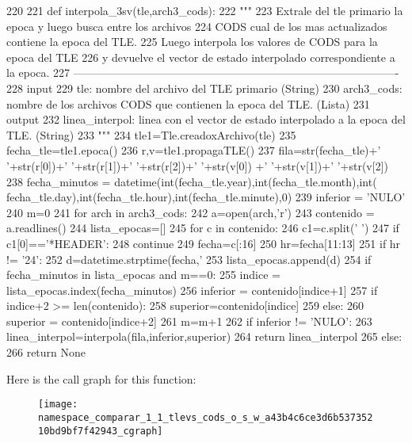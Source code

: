 \begin{DoxyCode}
220 
221 def interpola_3sv(tle,arch3_cods):
222     """
223     Extrale del tle primario la epoca y luego busca entre los archivos
224     CODS cual de los mas actualizados contiene la epoca del TLE.
225     Luego interpola los valores de CODS para la epoca del TLE 
226     y devuelve el vector de estado interpolado correspondiente a la epoca.
227    
       ----------------------------------------------------------------------------------------
228     input
229         tle: nombre del archivo del TLE primario (String)
230         arch3_cods: nombre de los archivos CODS que contienen la epoca del TLE.
       (Lista)
231     output
232         linea_interpol: linea con el vector de estado interpolado a la epoca
       del TLE. (String)
233     """
234     tle1=Tle.creadoxArchivo(tle)
235     fecha_tle=tle1.epoca()
236     r,v=tle1.propagaTLE()
237     fila=str(fecha_tle)+' '+str(r[0])+' '+str(r[1])+' '+str(r[2])+' '+str(v[0])
      +' '+str(v[1])+' '+str(v[2])
238     fecha_minutos = datetime(int(fecha_tle.year),int(fecha_tle.month),int(
      fecha_tle.day),int(fecha_tle.hour),int(fecha_tle.minute),0)
239     inferior = 'NULO' 
240     m=0
241     for arch in arch3_cods:
242         a=open(arch,'r')
243         contenido = a.readlines()
244         lista_epocas=[]
245         for c in contenido:
246             c1=c.split(' ')
247             if c1[0]=='*HEADER':
248                 continue
249             fecha=c[:16]
250             hr=fecha[11:13]
251             if hr != '24':
252                 d=datetime.strptime(fecha,'%
253             lista_epocas.append(d)
254         if fecha_minutos in lista_epocas and m==0:
255             indice = lista_epocas.index(fecha_minutos)
256             inferior = contenido[indice+1]
257             if indice+2 >= len(contenido):
258                 superior=contenido[indice]
259             else: 
260                 superior = contenido[indice+2]
261             m=m+1   
262     if inferior != 'NULO':         
263         linea_interpol=interpola(fila,inferior,superior)    
264         return linea_interpol
265     else:
266         return None

\end{DoxyCode}


\-Here is the call graph for this function\-:\nopagebreak
\begin{figure}[H]
\begin{center}
\leavevmode
\texttt{[image: namespace\_comparar\_1\_1\_tlevs\_cods\_o\_s\_w\_a43b4c6ce3d6b53735210bd9bf7f42943\_cgraph]}
\end{center}
\end{figure}




